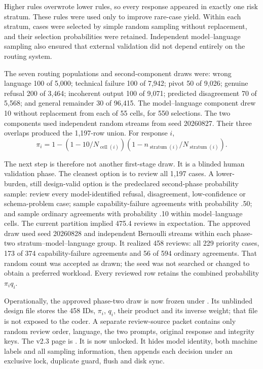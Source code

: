 Higher rules overwrote lower rules, so every response appeared in exactly one
risk stratum. These rules were used only to improve rare-case yield. Within
each stratum, cases were selected by simple random sampling without replacement,
and their selection probabilities were retained. Independent model--language
sampling also ensured that external validation did not depend entirely on the
routing system.

The seven routing populations and second-component draws were: wrong language
100 of 5,000; technical failure 100 of 7,942; pivot 50 of 9,026; genuine
refusal 200 of 3,464; incoherent output 100 of 9,071; predicted disagreement 70
of 5,568; and general remainder 30 of 96,415. The model--language component
drew 10 without replacement from each of 55 cells, for 550 selections. The two
components used independent random streams from seed 20260827. Their three
overlaps produced the 1,197-row union. For response \(i\),
\[
\pi_i=1-(1-10/N_{\operatorname{cell}(i)})
          (1-n_{\operatorname{stratum}(i)}/N_{\operatorname{stratum}(i)}).
\]

The next step is therefore not another first-stage draw. It is a blinded human
validation phase. The cleanest option is to review all 1,197 cases. A lower-
burden, still design-valid option is the predeclared second-phase probability
sample: review every model-identified refusal, disagreement, low-confidence or
schema-problem case; sample capability-failure agreements with probability
.50; and sample ordinary agreements with probability .10 within
model--language cells. The current partition implied 475.4 reviews in
expectation. The approved draw used seed 20260828 and independent Bernoulli
streams within each phase-two stratum--model--language group. It realized 458
reviews: all 229 priority cases, 173 of 374 capability-failure agreements and
56 of 594 ordinary agreements. That random count was accepted as drawn; the
seed was not searched or changed to obtain a preferred workload. Every
reviewed row retains the combined probability \(\pi_iq_i\).

Operationally, the approved phase-two draw is now frozen under
. Its unblinded design file stores
the 458 IDs, \(\pi_i\), \(q_i\), their product and its inverse weight; that file
is not exposed to the coder. A separate review-source packet contains only
random review order, language, the two prompts, original response and integrity
keys. The v2.3 page is
. It is now unlocked.
It hides model
identity, both machine labels and all sampling information, then appends each
decision under an exclusive lock, duplicate guard, flush and disk sync.


